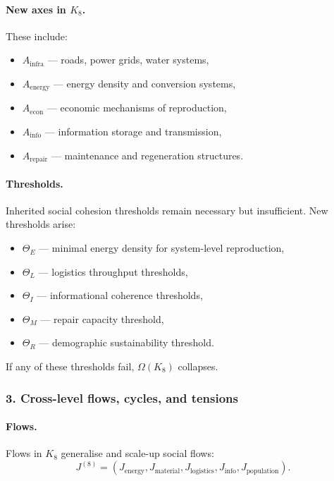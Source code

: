 \paragraph{New axes in \texorpdfstring{$K_8$}{K_8}.}
These include:
\begin{itemize}
  \item $A_{\mathrm{infra}}$ — roads, power grids, water systems,
  \item $A_{\mathrm{energy}}$ — energy density and conversion systems,
  \item $A_{\mathrm{econ}}$ — economic mechanisms of reproduction,
  \item $A_{\mathrm{info}}$ — information storage and transmission,
  \item $A_{\mathrm{repair}}$ — maintenance and regeneration structures.
\end{itemize}

\paragraph{Thresholds.}
Inherited social cohesion thresholds remain necessary but insufficient.
New thresholds arise:
\begin{itemize}
  \item $\Theta_E$ — minimal energy density for system-level reproduction,
  \item $\Theta_L$ — logistics throughput thresholds,
  \item $\Theta_I$ — informational coherence thresholds,
  \item $\Theta_M$ — repair capacity threshold,
  \item $\Theta_R$ — demographic sustainability threshold.
\end{itemize}

If any of these thresholds fail, $\Omega(K_8)$ collapses.

\subsubsection{3. Cross-level flows, cycles, and tensions}

\paragraph{Flows.}
Flows in $K_8$ generalise and scale-up social flows:
\[
J^{(8)} = (J_{\mathrm{energy}}, J_{\mathrm{material}}, 
          J_{\mathrm{logistics}}, J_{\mathrm{info}}, 
          J_{\mathrm{population}}).
\]

